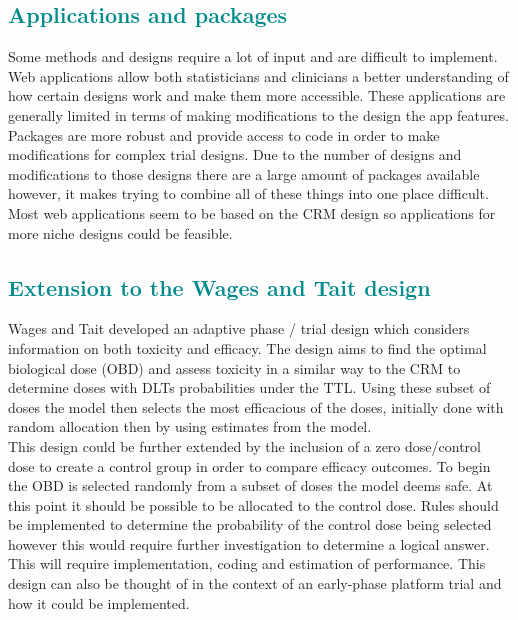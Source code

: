 \documentclass[a4paper, 11pt]{article} %
\newcommand{\RN}[1]{
	\textup{\uppercase\expandafter{\romannumeral#1}}} %
\begin{document}
\subsection{\textcolor{DarkCyan}{Applications and packages}}
Some methods and designs require a lot of input and are difficult to implement. Web applications allow both statisticians and clinicians a better understanding of how certain designs work and make them more accessible. These applications are generally limited in terms of making modifications to the design the app features. Packages are more robust and provide access to code in order to make modifications for complex trial designs. Due to the number of designs and modifications to those designs there are a large amount of packages available however, it makes trying to combine all of these things into one place difficult. Most web applications seem to be based on the CRM design so applications for more niche designs could be feasible.

\subsection{\textcolor{DarkCyan}{Extension to the Wages and Tait design}}
Wages and Tait \cite{Wages2015a} developed an adaptive phase\RN{1} /\RN{2} trial design which considers information on both toxicity and efficacy. The design aims to find the optimal biological dose (OBD) and assess toxicity in a similar way to the CRM to determine doses with DLTs probabilities under  the TTL. Using these subset of doses the model then selects the most efficacious of the doses, initially done with random allocation then by using estimates from the model. \\ 

\noindent This design could be further extended by the inclusion of a zero dose/control dose to create a control group in order to compare efficacy outcomes. To begin the OBD is selected randomly from a subset of doses the model deems safe. At this point it should be possible to be  allocated to the control dose. Rules should be implemented to determine the probability of the control dose being selected however this would require further investigation to determine a logical answer. This will require  implementation, coding and estimation of performance. This design can also be thought of in the context of an early-phase platform trial and how it could be implemented.
\end{document}
